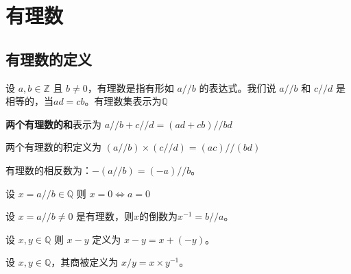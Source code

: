 \section{有理数}

\subsection{有理数的定义}\label{subsec:rational-numbers}

\begin{definition}[有理数]
	设 $a,b\in \mathbb Z$ 且 $b\ne 0$，有理数是指有形如 $a//b$ 的表达式。我们说 $a//b$ 和 $c//d$ 是相等的，当$ad=cb$。有理数集表示为$\mathbb Q$ 
\end{definition}

\begin{definition}[有理数加法]
	\textbf{两个有理数的和}表示为 $a//b + c//d =(ad+cb) // bd$
\end{definition}

\begin{definition}[有理数乘法]
	两个有理数的积定义为 $(a//b) \times (c//d) = (ac)//(bd)$
\end{definition}

\begin{definition}[相反数]
	有理数的相反数为：$-(a//b) = (-a)//b$。
\end{definition}

\begin{theorem}
	设 $x = a//b \in \mathbb Q$ 则 $x=0\iff a=0$
\end{theorem}

\begin{definition}[倒数]
	设 $x=a//b\ne 0$ 是有理数，则$x$的倒数为$x^{-1} = b//a$。
\end{definition}


\begin{definition}[减法]
	设 $x,y\in \mathbb Q$ 则 $x-y$ 定义为 $x-y=x+(-y)$。
\end{definition}

\begin{definition}[除法]
	设 $x,y\in \mathbb{Q}$，其商被定义为 $x/y = x\times y^{-1}$。
\end{definition}



